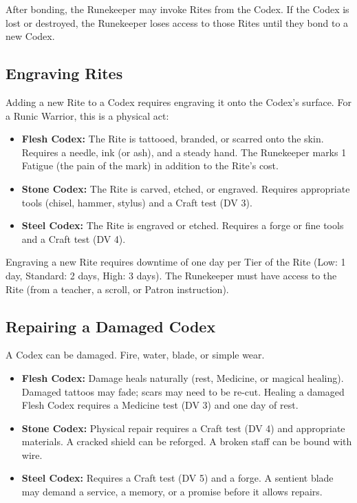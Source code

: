 After bonding, the Runekeeper may invoke Rites from the Codex. If the Codex is lost or destroyed, the Runekeeper loses access to those Rites until they bond to a new Codex.

\subsection{Engraving Rites}

Adding a new Rite to a Codex requires engraving it onto the Codex's surface. For a Runic Warrior, this is a physical act:

\begin{itemize}
\item \textbf{Flesh Codex:} The Rite is tattooed, branded, or scarred onto the skin. Requires a needle, ink (or ash), and a steady hand. The Runekeeper marks 1 Fatigue (the pain of the mark) in addition to the Rite's cost.
\item \textbf{Stone Codex:} The Rite is carved, etched, or engraved. Requires appropriate tools (chisel, hammer, stylus) and a Craft test (DV 3).
\item \textbf{Steel Codex:} The Rite is engraved or etched. Requires a forge or fine tools and a Craft test (DV 4).
\end{itemize}

Engraving a new Rite requires downtime of one day per Tier of the Rite (Low: 1 day, Standard: 2 days, High: 3 days). The Runekeeper must have access to the Rite (from a teacher, a scroll, or Patron instruction).

\subsection{Repairing a Damaged Codex}

A Codex can be damaged. Fire, water, blade, or simple wear.

\begin{itemize}
\item \textbf{Flesh Codex:} Damage heals naturally (rest, Medicine, or magical healing). Damaged tattoos may fade; scars may need to be re-cut. Healing a damaged Flesh Codex requires a Medicine test (DV 3) and one day of rest.
\item \textbf{Stone Codex:} Physical repair requires a Craft test (DV 4) and appropriate materials. A cracked shield can be reforged. A broken staff can be bound with wire.
\item \textbf{Steel Codex:} Requires a Craft test (DV 5) and a forge. A sentient blade may demand a service, a memory, or a promise before it allows repairs.
\end{itemize}

